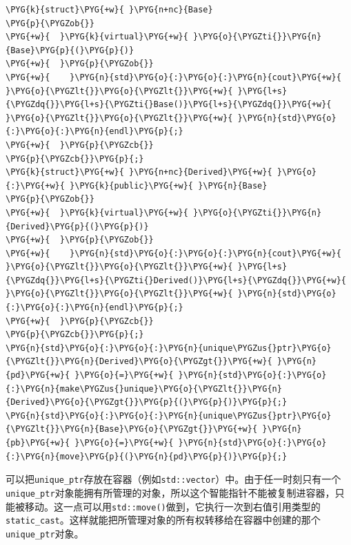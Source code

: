 \begin{codeblockbg}
\begin{Verbatim}[commandchars=\\\{\},breaklines=true,breakanywhere=true,fontsize=\codefont,xleftmargin=17bp]
\PYG{k}{struct}\PYG{+w}{ }\PYG{n+nc}{Base}
\PYG{p}{\PYGZob{}}
\PYG{+w}{  }\PYG{k}{virtual}\PYG{+w}{ }\PYG{o}{\PYGZti{}}\PYG{n}{Base}\PYG{p}{(}\PYG{p}{)}
\PYG{+w}{  }\PYG{p}{\PYGZob{}}
\PYG{+w}{    }\PYG{n}{std}\PYG{o}{:}\PYG{o}{:}\PYG{n}{cout}\PYG{+w}{ }\PYG{o}{\PYGZlt{}}\PYG{o}{\PYGZlt{}}\PYG{+w}{ }\PYG{l+s}{\PYGZdq{}}\PYG{l+s}{\PYGZti{}Base()}\PYG{l+s}{\PYGZdq{}}\PYG{+w}{ }\PYG{o}{\PYGZlt{}}\PYG{o}{\PYGZlt{}}\PYG{+w}{ }\PYG{n}{std}\PYG{o}{:}\PYG{o}{:}\PYG{n}{endl}\PYG{p}{;}
\PYG{+w}{  }\PYG{p}{\PYGZcb{}}
\PYG{p}{\PYGZcb{}}\PYG{p}{;}
\PYG{k}{struct}\PYG{+w}{ }\PYG{n+nc}{Derived}\PYG{+w}{ }\PYG{o}{:}\PYG{+w}{ }\PYG{k}{public}\PYG{+w}{ }\PYG{n}{Base}
\PYG{p}{\PYGZob{}}
\PYG{+w}{  }\PYG{k}{virtual}\PYG{+w}{ }\PYG{o}{\PYGZti{}}\PYG{n}{Derived}\PYG{p}{(}\PYG{p}{)}
\PYG{+w}{  }\PYG{p}{\PYGZob{}}
\PYG{+w}{    }\PYG{n}{std}\PYG{o}{:}\PYG{o}{:}\PYG{n}{cout}\PYG{+w}{ }\PYG{o}{\PYGZlt{}}\PYG{o}{\PYGZlt{}}\PYG{+w}{ }\PYG{l+s}{\PYGZdq{}}\PYG{l+s}{\PYGZti{}Derived()}\PYG{l+s}{\PYGZdq{}}\PYG{+w}{ }\PYG{o}{\PYGZlt{}}\PYG{o}{\PYGZlt{}}\PYG{+w}{ }\PYG{n}{std}\PYG{o}{:}\PYG{o}{:}\PYG{n}{endl}\PYG{p}{;}
\PYG{+w}{  }\PYG{p}{\PYGZcb{}}
\PYG{p}{\PYGZcb{}}\PYG{p}{;}
\PYG{n}{std}\PYG{o}{:}\PYG{o}{:}\PYG{n}{unique\PYGZus{}ptr}\PYG{o}{\PYGZlt{}}\PYG{n}{Derived}\PYG{o}{\PYGZgt{}}\PYG{+w}{ }\PYG{n}{pd}\PYG{+w}{ }\PYG{o}{=}\PYG{+w}{ }\PYG{n}{std}\PYG{o}{:}\PYG{o}{:}\PYG{n}{make\PYGZus{}unique}\PYG{o}{\PYGZlt{}}\PYG{n}{Derived}\PYG{o}{\PYGZgt{}}\PYG{p}{(}\PYG{p}{)}\PYG{p}{;}
\PYG{n}{std}\PYG{o}{:}\PYG{o}{:}\PYG{n}{unique\PYGZus{}ptr}\PYG{o}{\PYGZlt{}}\PYG{n}{Base}\PYG{o}{\PYGZgt{}}\PYG{+w}{ }\PYG{n}{pb}\PYG{+w}{ }\PYG{o}{=}\PYG{+w}{ }\PYG{n}{std}\PYG{o}{:}\PYG{o}{:}\PYG{n}{move}\PYG{p}{(}\PYG{n}{pd}\PYG{p}{)}\PYG{p}{;}
\end{Verbatim}
\end{codeblockbg}



可以把\texttt{unique\_\allowbreak{}ptr}存放在容器（例如\texttt{std::\allowbreak{}vector}）中。由于任一时刻只有一个\texttt{unique\_\allowbreak{}ptr}对象能拥有所管理的对象，所以这个智能指针不能被复制进容器，只能被移动。这一点可以用\texttt{std::\allowbreak{}move()}做到，它执行一次到右值引用类型的\texttt{static\_\allowbreak{}cast}。这样就能把所管理对象的所有权转移给在容器中创建的那个\texttt{unique\_\allowbreak{}ptr}对象。


